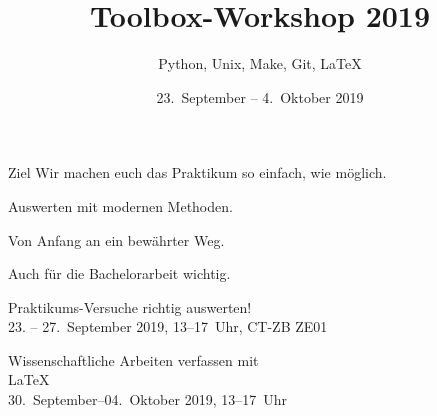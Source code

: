 

\title[Toolbox 2019]{Toolbox-Workshop 2019}
\subtitle{Python, Unix, Make, Git, \LaTeX{}}
\date{23.~September – 4.~Oktober 2019}
\author[Toolbox-Team]{}



\maketitle

\begin{frame}{Ziel}
  \setlength\parskip{3ex}
  \huge
  Wir machen euch das Praktikum so einfach, wie möglich.

  Auswerten mit modernen Methoden.

  Von Anfang an ein bewährter Weg.

  Auch für die Bachelorarbeit wichtig.
\end{frame}

\begin{frame}
  \vspace{2cm}
  \begin{center}
    \huge Praktikums-Versuche richtig auswerten!\\
    23. – 27.~September 2019, 13–17~Uhr, CT-ZB ZE01
  \end{center}
\end{frame}

\begin{frame}
  \begin{center}
    \huge Wissenschaftliche Arbeiten verfassen mit \\[0.5\baselineskip]
    \textrm{\fontsize{80}{120}\selectfont\LaTeX{}}\\[0.5\baselineskip]
    30.~September–04.~Oktober 2019, 13–17~Uhr
  \end{center}
\end{frame}

